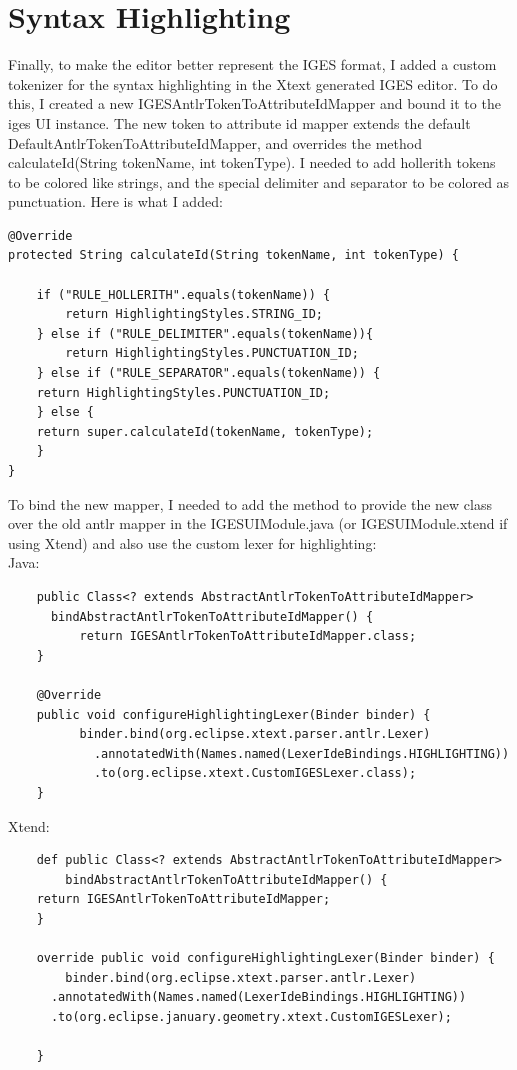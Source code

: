 \newpage

\section{Syntax Highlighting}
Finally, to make the editor better represent the IGES format, I added a custom tokenizer for the syntax highlighting in the Xtext generated IGES editor. To do this, I created a new IGESAntlrTokenToAttributeIdMapper and bound it to the iges UI instance. The new token to attribute id mapper extends the default DefaultAntlrTokenToAttributeIdMapper, and overrides the method calculateId(String tokenName, int tokenType). I needed to add hollerith tokens to be colored like strings, and the special delimiter and separator to be colored as punctuation. Here is what I added:

\begin{Verbatim}
@Override
protected String calculateId(String tokenName, int tokenType) {
		
    if ("RULE_HOLLERITH".equals(tokenName)) {
        return HighlightingStyles.STRING_ID;
    } else if ("RULE_DELIMITER".equals(tokenName)){
        return HighlightingStyles.PUNCTUATION_ID;
    } else if ("RULE_SEPARATOR".equals(tokenName)) {
	return HighlightingStyles.PUNCTUATION_ID;
    } else {
	return super.calculateId(tokenName, tokenType);
    }
}
\end{Verbatim}

To bind the new mapper, I needed to add the method to provide the new class over the old antlr mapper in the IGESUIModule.java (or IGESUIModule.xtend if using Xtend) and also use the custom lexer for highlighting: \\

Java:
\begin{Verbatim}
    public Class<? extends AbstractAntlrTokenToAttributeIdMapper>
      bindAbstractAntlrTokenToAttributeIdMapper() {
          return IGESAntlrTokenToAttributeIdMapper.class;
    }

    @Override
    public void configureHighlightingLexer(Binder binder) {
          binder.bind(org.eclipse.xtext.parser.antlr.Lexer)
            .annotatedWith(Names.named(LexerIdeBindings.HIGHLIGHTING))
            .to(org.eclipse.xtext.CustomIGESLexer.class);
    }
\end{Verbatim}


Xtend:
\begin{Verbatim}
    def public Class<? extends AbstractAntlrTokenToAttributeIdMapper>
        bindAbstractAntlrTokenToAttributeIdMapper() {
	return IGESAntlrTokenToAttributeIdMapper;
    }
	
    override public void configureHighlightingLexer(Binder binder) {
        binder.bind(org.eclipse.xtext.parser.antlr.Lexer)
	  .annotatedWith(Names.named(LexerIdeBindings.HIGHLIGHTING))
	  .to(org.eclipse.january.geometry.xtext.CustomIGESLexer);
	
    }
\end{Verbatim}

